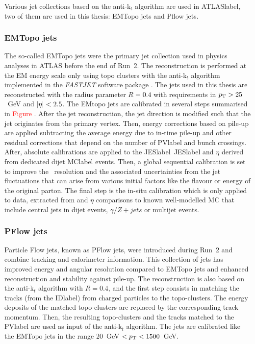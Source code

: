 Various jet collections based on the anti-k$_t$ algorithm are used in \acrshort{ATLASlabel}, two of them are used in this thesis: EMTopo jets and Pflow jets.

\subsubsection{EMTopo jets}

The so-called EMTopo jets were the primary jet collection used in physics analyses in \acrshort{ATLAS} before the end of Run~2. The reconstruction is performed at the EM energy scale only using topo clusters %
with the anti-k$_t$ algorithm implemented in the \textit{FASTJET} software package %
. The jets used in this thesis are reconstructed with the radius parameter $R = 0.4$ with requirements in $p_{\text{T}} > 25$~GeV and $\abs{\eta} < 2.5$. The EMtopo jets are calibrated in several steps summarised in \textcolor{red}{Figure} %
. After the jet reconstruction, the jet direction is modified such that the jet originates from the primary vertex. Then, energy corrections based on pile-up are applied subtracting the average energy due to in-time pile-up and other residual corrections that depend on the number of \acrshort{PVlabel} and bunch crossings. After, absolute calibrations are applied to the \acrlong{JESlabel}~\acrshort{JESlabel} and $\eta$ derived from dedicated dijet \acrshort{MClabel} events. Then, a global sequential calibration is set to improve the \pT\ resolution and the associated
uncertainties from the jet fluctuations that can arise from various initial factors like the flavour or energy of the original parton. The final step is the in-situ calibration which is only applied to data, extracted from \pT and $\eta$ comparisons to known well-modelled \acrshort{MC} that include central jets in dijet events, $\gamma/Z+jets$ or multijet events. 

\subsubsection{PFlow jets}

Particle Flow jets, known as PFlow jets, were introduced during Run~2 and combine tracking and calorimeter information. This collection of jets has improved energy and angular resolution compared to EMTopo jets and enhanced reconstruction and stability against pile-up. The reconstruction %
is also based on the anti-k$_t$ algorithm with $R=0.4$, and the first step consists in matching the tracks (from the \acrshort{IDlabel}) from charged particles to the topo-clusters. The energy deposits of the matched topo-clusters are replaced by the corresponding track momentum. Then, the resulting topo-clusters and the tracks matched to the \acrshort{PVlabel} are used as input of the anti-k$_t$ algorithm. The jets are calibrated like the EMTopo jets in the range 20~GeV $<p_{\text{T}}<1500$~GeV. 

